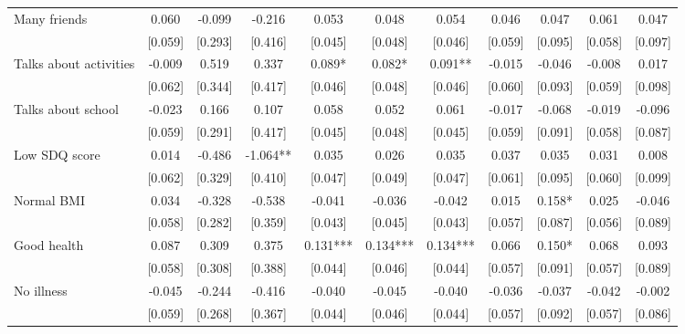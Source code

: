 \documentclass[12pt]{article}
\begin{document}
\begin{table}[ht]
\begin{center}
\begin{adjustbox}{width=1.2\textwidth,center=\textwidth}
\begin{tabular}{l*{10}{c}}
Many friends & 0.060 & -0.099 & -0.216 & 0.053 & 0.048 & 0.054 & 0.046 & 0.047 & 0.061 & 0.047 \\
 & [0.059] & [0.293] & [0.416] & [0.045] & [0.048] & [0.046] & [0.059] & [0.095] & [0.058] & [0.097] \\
Talks about activities & -0.009 & 0.519 & 0.337 & 0.089* & 0.082* & 0.091** & -0.015 & -0.046 & -0.008 & 0.017 \\
 & [0.062] & [0.344] & [0.417] & [0.046] & [0.048] & [0.046] & [0.060] & [0.093] & [0.059] & [0.098] \\
Talks about school & -0.023 & 0.166 & 0.107 & 0.058 & 0.052 & 0.061 & -0.017 & -0.068 & -0.019 & -0.096 \\
 & [0.059] & [0.291] & [0.417] & [0.045] & [0.048] & [0.045] & [0.059] & [0.091] & [0.058] & [0.087] \\
Low SDQ score  & 0.014 & -0.486 & -1.064** & 0.035 & 0.026 & 0.035 & 0.037 & 0.035 & 0.031 & 0.008 \\
 & [0.062] & [0.329] & [0.410] & [0.047] & [0.049] & [0.047] & [0.061] & [0.095] & [0.060] & [0.099] \\
Normal BMI & 0.034 & -0.328 & -0.538 & -0.041 & -0.036 & -0.042 & 0.015 & 0.158* & 0.025 & -0.046 \\
 & [0.058] & [0.282] & [0.359] & [0.043] & [0.045] & [0.043] & [0.057] & [0.087] & [0.056] & [0.089] \\
Good health & 0.087 & 0.309 & 0.375 & 0.131*** & 0.134*** & 0.134*** & 0.066 & 0.150* & 0.068 & 0.093 \\
 & [0.058] & [0.308] & [0.388] & [0.044] & [0.046] & [0.044] & [0.057] & [0.091] & [0.057] & [0.089] \\
No illness & -0.045 & -0.244 & -0.416 & -0.040 & -0.045 & -0.040 & -0.036 & -0.037 & -0.042 & -0.002 \\
 & [0.059] & [0.268] & [0.367] & [0.044] & [0.046] & [0.044] & [0.057] & [0.092] & [0.057] & [0.086] \\

\end{tabular}
\end{adjustbox}
\end{center}
\end{table}
\end{document}
